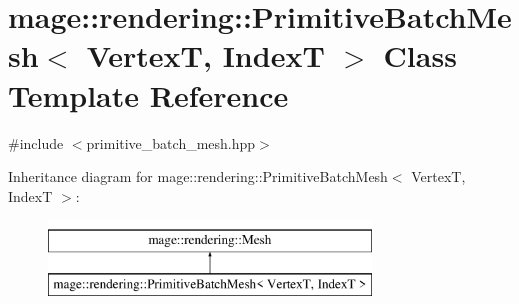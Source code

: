 \hypertarget{classmage_1_1rendering_1_1_primitive_batch_mesh}{}\section{mage\+:\+:rendering\+:\+:Primitive\+Batch\+Mesh$<$ VertexT, IndexT $>$ Class Template Reference}
\label{classmage_1_1rendering_1_1_primitive_batch_mesh}


{\ttfamily \#include $<$primitive\+\_\+batch\+\_\+mesh.\+hpp$>$}

Inheritance diagram for mage\+:\+:rendering\+:\+:Primitive\+Batch\+Mesh$<$ VertexT, IndexT $>$\+:\begin{figure}[H]
\begin{center}
\leavevmode
\includegraphics[height=2.000000cm]{classmage_1_1rendering_1_1_primitive_batch_mesh}
\end{center}
\end{figure}
